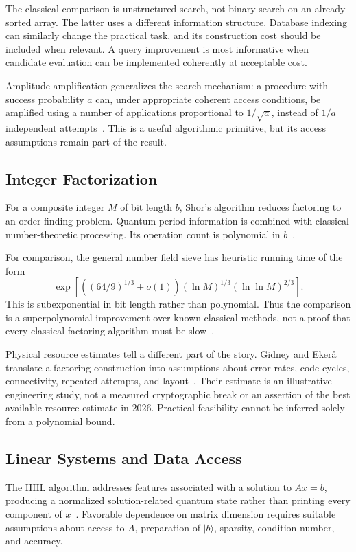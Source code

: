 \documentclass[conference]{IEEEtran}
\newcommand{\ket}[1]{\lvert #1\rangle}
\begin{document}
The classical comparison is unstructured search, not binary search on an already sorted array. The latter uses a different information structure. Database indexing can similarly change the practical task, and its construction cost should be included when relevant. A query improvement is most informative when candidate evaluation can be implemented coherently at acceptable cost.

Amplitude amplification generalizes the search mechanism: a procedure with success probability $a$ can, under appropriate coherent access conditions, be amplified using a number of applications proportional to $1/\sqrt a$, instead of $1/a$ independent attempts~\cite{brassard}. This is a useful algorithmic primitive, but its access assumptions remain part of the result.

\subsection{Integer Factorization}
For a composite integer $M$ of bit length $b$, Shor's algorithm reduces factoring to an order-finding problem. Quantum period information is combined with classical number-theoretic processing. Its operation count is polynomial in $b$~\cite{shor}.

For comparison, the general number field sieve has heuristic running time of the form~\cite{pomerance}
\begin{equation}
\exp\!\left[\left((64/9)^{1/3}+o(1)\right)
(\ln M)^{1/3}(\ln\ln M)^{2/3}\right].
\end{equation}
This is subexponential in bit length rather than polynomial. Thus the comparison is a superpolynomial improvement over known classical methods, not a proof that every classical factoring algorithm must be slow~\cite{shor}.

Physical resource estimates tell a different part of the story. Gidney and Eker\aa{} translate a factoring construction into assumptions about error rates, code cycles, connectivity, repeated attempts, and layout~\cite{gidney}. Their estimate is an illustrative engineering study, not a measured cryptographic break or an assertion of the best available resource estimate in 2026. Practical feasibility cannot be inferred solely from a polynomial bound.

\subsection{Linear Systems and Data Access}
The HHL algorithm addresses features associated with a solution to $A x=b$, producing a normalized solution-related quantum state rather than printing every component of $x$~\cite{hhl}. Favorable dependence on matrix dimension requires suitable assumptions about access to $A$, preparation of $\ket b$, sparsity, condition number, and accuracy.
\end{document}
